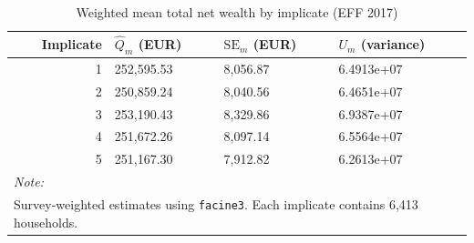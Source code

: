 \begin{table}[!h]

\caption{\label{tab:implicates}Weighted mean total net wealth by implicate (EFF 2017)}
\centering
\begin{tabular}[t]{rlll}
\toprule
Implicate & $\hat{Q}_m$ (EUR) & $\text{SE}_m$ (EUR) & $U_m$ (variance)\\
\midrule
1 & 252,595.53 & 8,056.87 & 6.4913e+07\\
2 & 250,859.24 & 8,040.56 & 6.4651e+07\\
3 & 253,190.43 & 8,329.86 & 6.9387e+07\\
4 & 251,672.26 & 8,097.14 & 6.5564e+07\\
5 & 251,167.30 & 7,912.82 & 6.2613e+07\\
\bottomrule
\multicolumn{4}{l}{\rule{0pt}{1em}\textit{Note:}}\\
\multicolumn{4}{l}{\rule{0pt}{1em}Survey-weighted estimates using \texttt{facine3}. Each implicate contains 6,413 households.}\\
\end{tabular}
\end{table}

